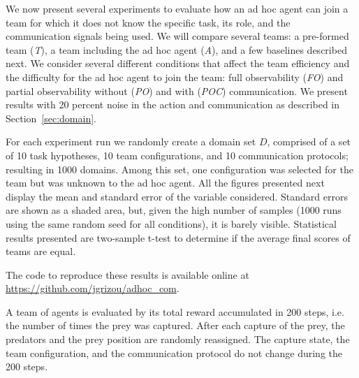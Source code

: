 We now present several experiments to evaluate how an ad hoc agent can join a team for which it does not know the specific task, its role, and the communication signals being used. We will compare several teams: a pre-formed team (\emph{T}), a team including the ad hoc agent (\emph{A}), and a few baselines described next. We consider several different conditions that affect the team efficiency and the difficulty for the ad hoc agent to join the team: full observability (\emph{FO}) and partial observability without (\emph{PO}) and with (\emph{POC}) communication. We present results with 20 percent noise in the action and communication as described in Section~\ref{sec:domain}.

For each experiment run we randomly create a domain set $D$, comprised of a set of 10 task hypotheses, 10 team configurations, and 10 communication protocols; resulting in 1000 domains. Among this set, one configuration was selected for the team but was unknown to the ad hoc agent. All the figures presented next display the mean and standard error of the variable considered. Standard errors are shown as a shaded area, but, given the high number of samples (1000 runs using the same random seed for all conditions), it is barely visible. Statistical results presented are two-sample t-test to determine if the average final scores of teams are equal.

The code to reproduce these results is available online at \url{https://github.com/jgrizou/adhoc_com}.

A team of agents is evaluated by its total reward accumulated in 200 steps, i.e. the number of times the prey was captured. After each capture of the prey, the predators and the prey position are randomly reassigned. The capture state, the team configuration, and the communication protocol do not change during the 200 steps.



